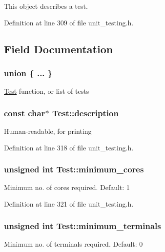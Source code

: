 This object describes a test. 

Definition at line 309 of file unit\+\_\+testing.\+h.



\subsection{Field Documentation}
\subsubsection[{\texorpdfstring{"@3}{@3}}]{\setlength{\rightskip}{0pt plus 5cm}union \{ ... \} }\hypertarget{structTest_a6dd50dae1a4469e7723e85331dbf9ba0}{}\label{structTest_a6dd50dae1a4469e7723e85331dbf9ba0}
\hyperlink{structTest}{Test} function, or list of tests 
\subsubsection[{\texorpdfstring{description}{description}}]{\setlength{\rightskip}{0pt plus 5cm}const char$\ast$ Test\+::description}\hypertarget{structTest_a294ca3f1114240c908f66216afcad783}{}\label{structTest_a294ca3f1114240c908f66216afcad783}
Human-\/readable, for printing 

Definition at line 318 of file unit\+\_\+testing.\+h.

\subsubsection[{\texorpdfstring{minimum\+\_\+cores}{minimum_cores}}]{\setlength{\rightskip}{0pt plus 5cm}unsigned int Test\+::minimum\+\_\+cores}\hypertarget{structTest_ac203918837b4c6718a020246e189a95a}{}\label{structTest_ac203918837b4c6718a020246e189a95a}
Minimum no. of cores required. Default\+: 1 

Definition at line 321 of file unit\+\_\+testing.\+h.

\subsubsection[{\texorpdfstring{minimum\+\_\+terminals}{minimum_terminals}}]{\setlength{\rightskip}{0pt plus 5cm}unsigned int Test\+::minimum\+\_\+terminals}\hypertarget{structTest_a2741188633c51b8e3cb545fa3971bf60}{}\label{structTest_a2741188633c51b8e3cb545fa3971bf60}
Minimum no. of terminals required. Default\+: 0 

